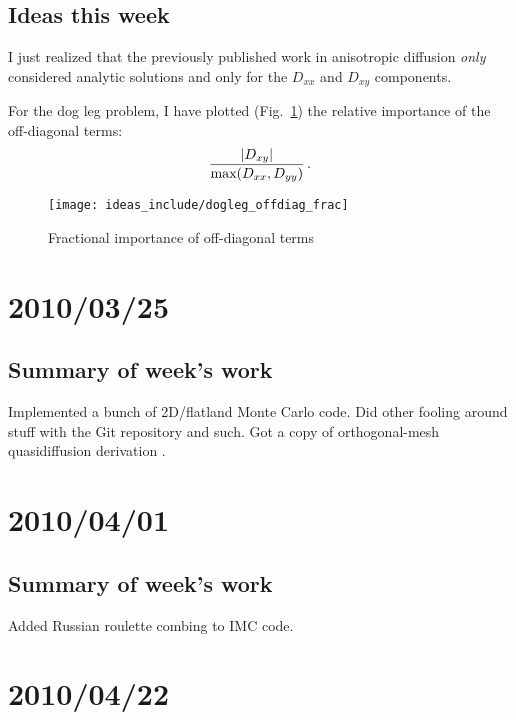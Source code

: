 \documentclass[11pt]{SRJresearch}
\begin{document}
\subsection{Ideas this week}
I just realized that the previously published work in anisotropic diffusion
\emph{only} considered analytic solutions and only for the $D_{xx}$ and
$D_{xy}$ components.

For the dog leg problem, I have plotted (Fig.~\ref{fig:offdiagFrac}) the
relative importance of the off-diagonal terms:
\begin{equation*}
  \frac{\left| D_{xy} \right|}{\text{max}(D_{xx}, D_{yy})} \,.
\end{equation*}

\begin{figure}[htb]
  \centering
  \texttt{[image: ideas\_include/dogleg\_offdiag\_frac]}
  \caption{Fractional importance of off-diagonal terms}
  \label{fig:offdiagFrac}
\end{figure}
\section{2010/03/25}

\subsection{Summary of week's work}
Implemented a bunch of 2D/flatland Monte Carlo code. Did other fooling around
stuff with the Git repository and such. Got a copy of orthogonal-mesh
quasidiffusion derivation \cite{Val2002}.

\section{2010/04/01}

\subsection{Summary of week's work}
Added Russian roulette combing to IMC code.

\section{2010/04/22}
\end{document}
